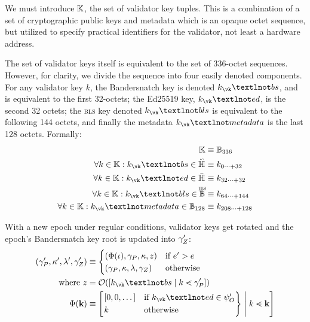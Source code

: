We must introduce $\mathbb{K}$, the set of validator key tuples. This is a combination of a set of cryptographic public keys and metadata which is an opaque octet sequence, but utilized to specify practical identifiers for the validator, not least a hardware address.

The set of validator keys itself is equivalent to the set of 336-octet sequences. However, for clarity, we divide the sequence into four easily denoted components. For any validator key $k$, the Bandersnatch key is denoted $k_\vk¬bs$, and is equivalent to the first 32-octets; the Ed25519 key, $k_\vk¬ed$, is the second 32 octets; the \textsc{bls} key denoted $k_\vk¬bls$ is equivalent to the following 144 octets, and finally the metadata $k_\vk¬metadata$ is the last 128 octets. Formally:
\begin{align}
  \valkey &\equiv \blob[336] \\
  \forall \vkX \in \valkey : \vkX_\vk¬bs \in \bskey &\equiv \vkX\subrange{0}{32} \\
  \forall \vkX \in \valkey : \vkX_\vk¬ed \in \edkey &\equiv \vkX\subrange{32}{32} \\
  \forall \vkX \in \valkey : \vkX_\vk¬bls \in \blskey &\equiv \vkX\subrange{64}{144} \\
  \forall \vkX \in \valkey : \vkX_\vk¬metadata \in \metadatakey &\equiv \vkX\subrange{208}{128}
\end{align}

With a new epoch under regular conditions, validator keys get rotated and the epoch's Bandersnatch key root is updated into $\gamma_Z'$:
\begin{align}
  \tup{\pendingset', \activeset', \previousset', \epochroot'} &\equiv \begin{cases}
    (\Phi(\stagingset), \pendingset, \activeset, z) &\when e' > e \\ \tup{\pendingset, \activeset, \previousset, \epochroot} &\otherwise
  \end{cases} \\
  \nonumber \where z &= \getringroot{\sq{\build{k_\vk¬bs}{k \orderedin \pendingset'}}} \\
  \label{eq:blacklistfilter} \Phi(\mathbf{k}) &\equiv \sq{
    \build{
      \begin{rcases}
        \sq{0, 0, \dots} &\when \vkX_\vk¬ed \in \offenders' \\
        \vkX &\otherwise
      \end{rcases}
    }{
      \vkX \orderedin \mathbf{k}
    }
  }
\end{align}

